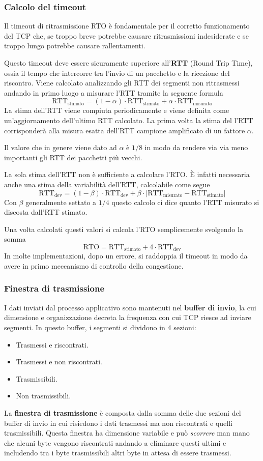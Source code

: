 \subsubsection{Calcolo del timeout}
Il timeout di ritrasmissione RTO è fondamentale per il corretto 
funzionamento del TCP che, se troppo breve potrebbe causare 
ritrasmissioni indesiderate e se troppo lungo potrebbe causare 
rallentamenti.

Questo timeout deve essere sicuramente superiore all'\textbf{RTT} 
(Round Trip Time), ossia il tempo che intercorre tra l'invio di un 
pacchetto e la ricezione del riscontro. Viene calcolato analizzando 
gli RTT dei segmenti non ritrasmessi andando in primo luogo a misurare 
l'RTT tramite la seguente formula
\[
	\text{RTT}_\text{stimato} = 
	(1 - \alpha) \cdot \text{RTT}_\text{stimato} +
	\alpha \cdot \text{RTT}_\text{misurato}
\]
La stima dell'RTT viene compiuta periodicamente e viene definita come 
un'aggiornamento dell'ultimo RTT calcolato. La prima volta la stima del
l'RTT corrisponderà alla misura esatta dell'RTT campione amplificato 
di un fattore $\alpha$.

Il valore che in genere viene dato ad $\alpha$ è $1/8$ in modo da 
rendere via via meno importanti gli RTT dei pacchetti più vecchi.

La sola stima dell'RTT non è sufficiente a calcolare l'RTO. \`E infatti
necessaria anche una stima della variabilità dell'RTT, calcolabile come
segue
\[
	\text{RTT}_\text{dev} = 
	(1 - \beta) \cdot \text{RTT}_\text{dev} + 
	\beta \cdot |\text{RTT}_\text{misurato} - 
	\text{RTT}_\text{stimato}|
\]
Con $\beta$ generalmente settato a $1/4$ questo calcolo ci dice quanto 
l'RTT misurato si discosta dall'RTT stimato.

Una volta calcolati questi valori si calcola l'RTO semplicemente 
svolgendo la somma 
\[
	\text{RTO} = 
	\text{RTT}_\text{stimato} + 
	4 \cdot \text{RTT}_\text{dev}
\]
In molte implementazioni, dopo un errore, si raddoppia il timeout in 
modo da avere in primo meccanismo di controllo della congestione.

\subsubsection{Finestra di trasmissione}
I dati inviati dal processo applicativo sono mantenuti nel 
\textbf{buffer di invio}, la cui dimensione e organizzazione decreta
la frequenza con cui TCP riesce ad inviare segmenti. In questo buffer,
i segmenti si dividono in 4 sezioni:
\begin{itemize}
	\item Trasmessi e riscontrati.
	\item Trasmessi e non riscontrati.
	\item Trasmissibili.
	\item Non trasmissibili.
\end{itemize}
La \textbf{finestra di trasmissione} è composta dalla somma delle due 
sezioni del buffer di invio in cui risiedono i dati trasmessi ma non 
riscontrati e quelli trasmissibili. Questa finestra ha dimensione 
variabile e può \emph{scorrere} man mano che alcuni byte vengono 
riscontrati andando a eliminare questi ultimi e includendo tra i byte 
trasmissibili altri byte in attesa di essere trasmessi.

